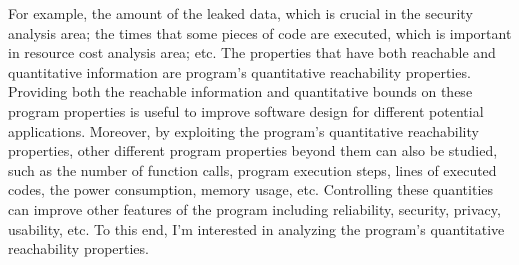 For example, the amount of the leaked data, which is crucial in the security analysis area;
the times that some pieces of code are executed, which is important in resource cost analysis area; etc.
The properties that have both reachable and quantitative information are
program's quantitative reachability properties.
Providing both the reachable information and quantitative bounds on 
these program properties is useful to improve software design for different potential applications.
Moreover, 
by exploiting the program's quantitative reachability properties,
other different program properties beyond them can also be 
studied,
such as the number of function calls,
program execution steps,
lines of executed codes,
the power consumption, memory usage, etc. 
Controlling
these quantities
can improve other features of the program including reliability, security, privacy, usability, etc.
To this end, I'm interested in
analyzing the program's quantitative reachability properties.
